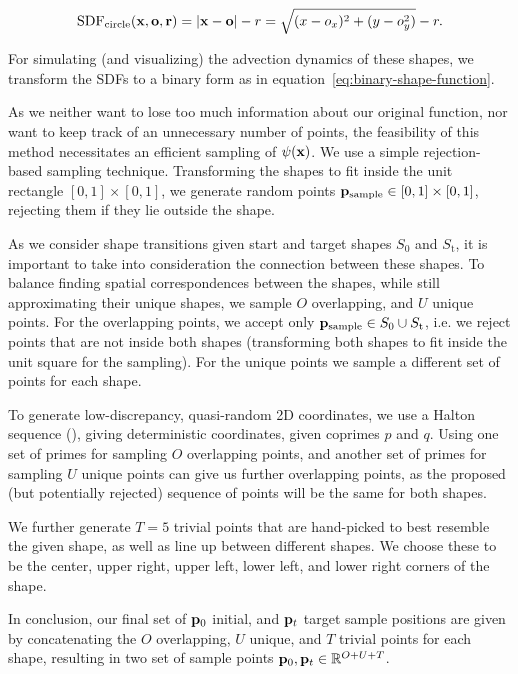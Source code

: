 $$\text{SDF}_{\text{circle}}(\vb{x, \vb{o}, r}) 
  = \abs{\vb{x}-\vb{o}} - r
  = \sqrt{(x-o_x)^2 + (y-o_y^2)} - r.$$

For simulating (and visualizing) the advection dynamics of these shapes, we
transform the SDFs to a binary form as in
equation~\eqref{eq:binary-shape-function}.

As we neither want to lose too much information about our original function, nor
want to keep track of an unnecessary number of points, the feasibility of this
method necessitates an efficient sampling of $\psi(\vb{x})$. We use a simple
rejection-based sampling technique. Transforming the shapes to fit inside the
unit rectangle $[0,1]\times[0,1]$, we generate random points
$\vb{p}_\text{sample}\in [0,1]\times[0,1]$, rejecting them if they lie outside
the shape.

As we consider shape transitions given start and target shapes $S_\text{0}$ and
$S_\text{t}$, it is important to take into consideration the connection between
these shapes. To balance finding spatial correspondences between the shapes,
while still approximating their unique shapes, we sample $O$ overlapping, and
$U$ unique points. For the overlapping points, we accept only
$\vb{p}_\text{sample} \in S_\text{0} \cup S_\text{t}$, i.e. we reject points
that are not inside both shapes (transforming both shapes to fit inside the unit
square for the sampling). For the unique points we sample a different set of
points for each shape. 

To generate low-discrepancy, quasi-random 2D coordinates, we use a Halton
sequence (\cite{halton}), giving deterministic coordinates, given coprimes $p$
and $q$. Using one set of primes for sampling $O$ overlapping points, and
another set of primes for sampling $U$ unique points can give us further
overlapping points, as the proposed (but potentially rejected) sequence of
points will be the same for both shapes.

We further generate $T=5$ trivial points that are hand-picked to best resemble
the given shape, as well as line up between different shapes. We choose these to
be the center, upper right, upper left, lower left, and lower right corners of
the shape. 

In conclusion, our final set of $\vb{p}_0$ initial, and $\vb{p}_t$ target sample
positions are given by concatenating the $O$ overlapping, $U$ unique, and $T$
trivial points for each shape, resulting in two set of sample points $\vb{p}_0,
\vb{p}_t \in \mathbb{R}^{O+U+T}$.

